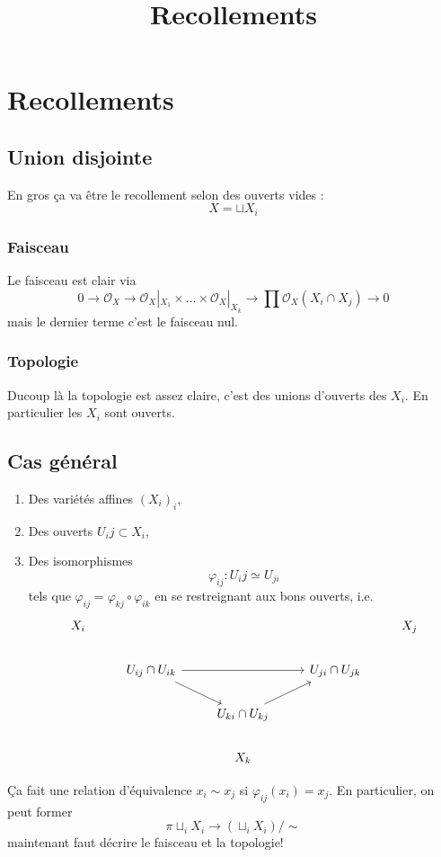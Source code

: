 \documentclass[a4paper,12pt]{book}
\title{Recollements}
\date{}
\newcommand{\Or}{\mathcal{O}}
\theoremstyle{plain}
\theoremstyle{definition}
\theoremstyle{remark}
\begin{document}
\maketitle
\tableofcontents

\chapter{Recollements}
\section{Union disjointe}
En gros ça va être le recollement selon
des ouverts vides :
\[X=\sqcup X_i\]

\subsection{Faisceau}
Le faisceau est clair via 
\[0\to \Or_X\to \Or_X|_{X_1}\times\ldots\times \Or_X|_{X_k}\to \prod \Or_X(X_i\cap X_j)\to 0\]
mais le dernier terme c'est le faisceau nul. 
\subsection{Topologie}
Ducoup là la topologie est assez claire, c'est des unions d'ouverts
des $X_i$. En particulier les $X_i$ sont ouverts.


\section{Cas général}
\begin{enumerate}
  \item Des variétés affines $(X_i)_{i}$,
  \item Des ouverts $U_ij\subset X_i$,
  \item Des isomorphismes 
    \[\varphi_{ij}\colon U_ij\simeq U_{ji}\]
    tels que $\varphi_{ij}=\varphi_{kj}\circ \varphi_{ik}$
    en se restreignant aux bons ouverts, i.e. 
\[\begin{tikzcd}
	{X_i} &&&& {X_j} \\
	& {U_{ij}\cap U_{ik}} && {U_{ji}\cap U_{jk}} \\
	&& {U_{ki}\cap U_{kj}} \\
	&& {X_k}
	\arrow[from=2-2, to=2-4]
	\arrow[from=2-2, to=3-3]
	\arrow[from=3-3, to=2-4]
\end{tikzcd}\]
\end{enumerate}
Ça fait une relation d'équivalence $x_i\sim x_j$
si $\varphi_{ij}(x_i)=x_j$. En particulier, on peut
former 
\[\pi \sqcup_i X_i\to(\sqcup_i X_i)/\sim\]
maintenant faut décrire le faisceau et la topologie!
\end{document}
